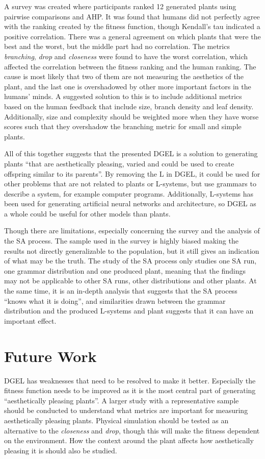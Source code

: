 A survey was created where participants ranked 12 generated plants using pairwise comparisons and \gls{AHP}.
It was found that humans did not perfectly agree with the ranking created by the fitness function, though Kendall's tau indicated a positive correlation.
There was a general agreement on which plants that were the best and the worst, but the middle part had no correlation.
The metrics \textit{branching}, \textit{drop} and \textit{closeness} were found to have the worst correlation, which affected the correlation between the fitness ranking and the human ranking.
The cause is most likely that two of them are not measuring the aesthetics of the plant, and the last one is overshadowed by other more important factors in the humans' minds.
A suggested solution to this is to include additional metrics based on the human feedback that include size, branch density and leaf density.
Additionally, size and complexity should be weighted more when they have worse scores such that they overshadow the branching metric for small and simple plants.

All of this together suggests that the presented \gls{DGEL} is a solution to generating plants ``that are aesthetically pleasing, varied and could be used to create offspring similar to its parents''.
By removing the L in \gls{DGEL}, it could be used for other problems that are not related to plants or \glspl{L-system}, but use grammars to describe a system, for example computer programs.
Additionally, \glspl{L-system} has been used for generating artificial neural networks and architecture, so \gls{DGEL} as a whole could be useful for other models than plants.

Though there are limitations, especially concerning the survey and the analysis of the \gls{SA} process.
The sample used in the survey is highly biased making the results not directly generalizable to the population, but it still gives an indication of what may be the truth.
The study of the \gls{SA} process only studies one \gls{SA} run, one grammar distribution and one produced plant, meaning that the findings may not be applicable to other \gls{SA} runs, other distributions and other plants.
At the same time, it is an in-depth analysis that suggests that the \gls{SA} process ``knows what it is doing'', and similarities drawn between the grammar distribution and the produced \glspl{L-system} and plant suggests that it can have an important effect.

\section{Future Work}
\gls{DGEL} has weaknesses that need to be resolved to make it better.
Especially the fitness function needs to be improved as it is the most central part of generating ``aesthetically pleasing plants''.
A larger study with a representative sample should be conducted to understand what metrics are important for measuring aesthetically pleasing plants.
Physical simulation should be tested as an alternative to the \textit{closeness} and \textit{drop}, though this will make the fitness dependent on the environment.
How the context around the plant affects how aesthetically pleasing it is should also be studied.

